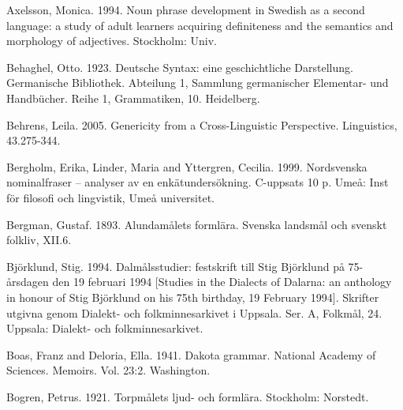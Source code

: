 Axelsson, Monica. 1994. Noun phrase development in Swedish as a second language: a study of adult learners acquiring definiteness and the semantics and morphology of adjectives. Stockholm: Univ.


Behaghel, Otto. 1923. Deutsche Syntax: eine geschichtliche Darstellung. Germanische Bibliothek. Abteilung 1, Sammlung germanischer Elementar- und Handbücher. Reihe 1, Grammatiken, 10. Heidelberg.


Behrens, Leila. 2005. Genericity from a Cross-Linguistic Perspective. Linguistics, 43.275-344.


Bergholm, Erika, Linder, Maria and Yttergren, Cecilia. 1999. Nordsvenska nominalfraser – analyser av en enkätundersökning. C-uppsats 10 p. Umeå: Inst för filosofi och lingvistik, Umeå universitet.


Bergman, Gustaf. 1893. Alundamålets formlära. Svenska landsmål och svenskt folkliv, XII.6.


Björklund, Stig. 1994. Dalmålsstudier: festskrift till Stig Björklund på 75-årsdagen den 19 februari 1994 [Studies in the Dialects of Dalarna: an anthology in honour of Stig Björklund on his 75th birthday, 19 February 1994]. Skrifter utgivna genom Dialekt- och folkminnesarkivet i Uppsala. Ser. A, Folkmål, 24. Uppsala: Dialekt- och folkminnesarkivet.


Boas, Franz and Deloria, Ella. 1941. Dakota grammar. National Academy of Sciences. Memoirs. Vol. 23:2. Washington.


Bogren, Petrus. 1921. Torpmålets ljud- och formlära. Stockholm: Norstedt.


